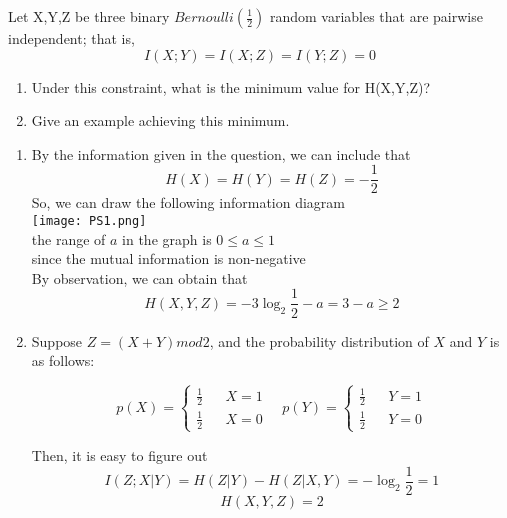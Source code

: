 \documentclass[12pt]{article}
\newenvironment{solution}[2][Solution]{\begin{trivlist}
\item[\hskip \labelsep {\bfseries #1}]}{\end{trivlist}}
\newenvironment{problem}[2][Problem]{\begin{trivlist}
\item[\hskip \labelsep {\bfseries #1}\hskip \labelsep {\bfseries #2.}]}{\end{trivlist}}
\begin{document}
\begin{problem}{4 Entropy and Pairwise independence}
    \item Let X,Y,Z be three binary $Bernoulli\left(\frac{1}{2}\right)$ random variables that are pairwise independent; that is, 
    $$I(X;Y)=I(X;Z)=I(Y;Z)=0$$
    \begin{enumerate}[label=\alph*)]
        \item 
        Under this constraint, what is the minimum value for H(X,Y,Z)?
        \item
        Give an example achieving this minimum.
    \end{enumerate}    
\end{problem}

\begin{solution}{}
    \begin{enumerate}[label=\alph*)]
        \item 
        By the information given in the question, we can include that
        $$H(X)=H(Y)=H(Z)=-\frac{1}{2}$$
        So, we can draw the following information diagram\\
        \texttt{[image: PS1.png]}\\
        the range of $a$ in the graph is $0\leq a\leq1$\\
        since the mutual information is non-negative\\
        By observation, we can obtain that
        $$H(X,Y,Z)=-3\log_2\frac{1}{2}-a=3-a\geq 2 $$
        \item
            Suppose $Z=(X+Y)mod2$, and the probability distribution of $X$ and $Y$ is as follows:
            \begin{spacing}{1.5}
            $$p(X)=\left\{
            \begin{array}{rcl}
            \frac{1}{2} & & {X=1} \\
            \frac{1}{2} & & {X=0} 
            \end{array}
            \right.
            \quad
            p(Y)=\left\{
            \begin{array}{rcl}
            \frac{1}{2} & & {Y=1} \\
            \frac{1}{2} & & {Y=0} 
            \end{array}
            \right.
            $$
            \end{spacing}
            Then, it is easy to figure out 
            $$I(Z;X|Y)=H(Z|Y)-H(Z|X,Y)=-\log_2\frac{1}{2}=1$$
            $$H(X,Y,Z)=2$$
    \end{enumerate}
\end{solution}
\end{document}
